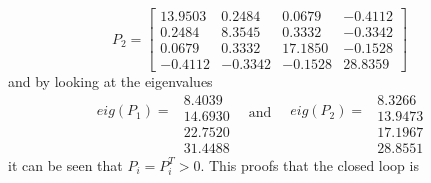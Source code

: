 \begin{equation}
    P_2 = \begin{bmatrix}
    13.9503 & 0.2484 & 0.0679 &  -0.4112\\
    0.2484 & 8.3545 & 0.3332 & -0.3342 \\
    0.0679 & 0.3332 & 17.1850 & -0.1528\\
    -0.4112 & -0.3342 & -0.1528 & 28.8359
    \end{bmatrix}
    \label{eq:ex1d_P2}
\end{equation}
and by looking at the eigenvalues
\begin{equation}
   \begin{matrix} eig(P_1)  =\\ \\ \\ \\ \end{matrix} \begin{matrix} 8.4039 \\ 14.6930 \\ 22.7520 \\ 31.4488 \end{matrix} \; \; \begin{matrix} \text{and}\\ \\ \\ \\ \end{matrix} \; \; 
    \begin{matrix} eig(P_2) =\\ \\ \\ \\\end{matrix}\begin{matrix} 8.3266 \\ 13.9473 \\ 17.1967 \\ 28.8551 \end{matrix}
    \label{eq:ex1d_eigP}
\end{equation}
it can be seen that $P_i = P_i^T> 0$. This proofs that the closed loop is 